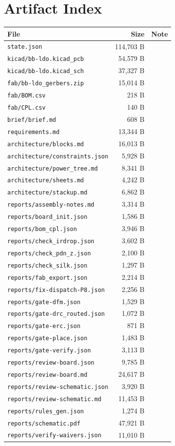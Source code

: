 \documentclass[11pt,a4paper]{article}
\begin{document}
\section{Artifact Index}
{\small
\begin{longtable}{p{9cm}rp{4cm}}
\toprule
\textbf{File} & \textbf{Size} & \textbf{Note} \\
\midrule
\endhead
\texttt{state.json} & 114,703 B &  \\
\texttt{kicad/bb-ldo.kicad\_pcb} & 54,579 B &  \\
\texttt{kicad/bb-ldo.kicad\_sch} & 37,327 B &  \\
\texttt{fab/bb-ldo\_gerbers.zip} & 15,014 B &  \\
\texttt{fab/BOM.csv} & 218 B &  \\
\texttt{fab/CPL.csv} & 140 B &  \\
\texttt{brief/brief.md} & 608 B &  \\
\texttt{requirements.md} & 13,344 B &  \\
\texttt{architecture/blocks.md} & 16,013 B &  \\
\texttt{architecture/constraints.json} & 5,928 B &  \\
\texttt{architecture/power\_tree.md} & 8,341 B &  \\
\texttt{architecture/sheets.md} & 4,242 B &  \\
\texttt{architecture/stackup.md} & 6,862 B &  \\
\texttt{reports/assembly-notes.md} & 3,314 B &  \\
\texttt{reports/board\_init.json} & 1,586 B &  \\
\texttt{reports/bom\_cpl.json} & 3,946 B &  \\
\texttt{reports/check\_irdrop.json} & 3,602 B &  \\
\texttt{reports/check\_pdn\_z.json} & 2,100 B &  \\
\texttt{reports/check\_silk.json} & 1,297 B &  \\
\texttt{reports/fab\_export.json} & 2,214 B &  \\
\texttt{reports/fix-dispatch-P8.json} & 2,256 B &  \\
\texttt{reports/gate-dfm.json} & 1,529 B &  \\
\texttt{reports/gate-drc\_routed.json} & 1,072 B &  \\
\texttt{reports/gate-erc.json} & 871 B &  \\
\texttt{reports/gate-place.json} & 1,483 B &  \\
\texttt{reports/gate-verify.json} & 3,113 B &  \\
\texttt{reports/review-board.json} & 9,785 B &  \\
\texttt{reports/review-board.md} & 24,617 B &  \\
\texttt{reports/review-schematic.json} & 3,920 B &  \\
\texttt{reports/review-schematic.md} & 11,453 B &  \\
\texttt{reports/rules\_gen.json} & 1,274 B &  \\
\texttt{reports/schematic.pdf} & 47,921 B &  \\
\texttt{reports/verify-waivers.json} & 11,010 B &  \\
\bottomrule
\end{longtable}
}
\end{document}
